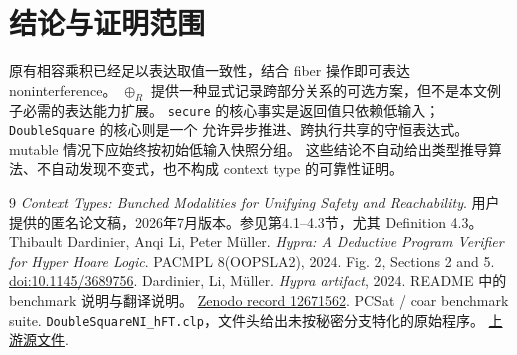 \documentclass[UTF8,a4paper,11pt,fontset=fandol]{ctexart}
\begin{document}
\section{结论与证明范围}
原有相容乘积已经足以表达取值一致性，结合 fiber 操作即可表达 noninterference。
$\oplus_R$ 提供一种显式记录跨部分关系的可选方案，但不是本文例子必需的表达能力扩展。
\texttt{secure} 的核心事实是返回值只依赖低输入；\texttt{DoubleSquare} 的核心则是一个
允许异步推进、跨执行共享的守恒表达式。mutable 情况下应始终按初始低输入快照分组。
这些结论不自动给出类型推导算法、不自动发现不变式，也不构成 context type 的可靠性证明。

\begin{thebibliography}{9}
\emph{Context Types: Bunched Modalities for Unifying Safety and Reachability}.
用户提供的匿名论文稿，2026年7月版本。参见第4.1--4.3节，尤其 Definition 4.3。
Thibault Dardinier, Anqi Li, Peter M\"uller.
\emph{Hypra: A Deductive Program Verifier for Hyper Hoare Logic}.
PACMPL 8(OOPSLA2), 2024. Fig. 2, Sections 2 and 5.
\href{https://doi.org/10.1145/3689756}{doi:10.1145/3689756}.
Dardinier, Li, M\"uller.
\emph{Hypra artifact}, 2024. README 中的 benchmark 说明与翻译说明。
\href{https://zenodo.org/records/12671562}{Zenodo record 12671562}.
PCSat / coar benchmark suite.
\texttt{DoubleSquareNI\_hFT.clp}，文件头给出未按秘密分支特化的原始程序。
\href{https://github.com/hiroshi-unno/coar/blob/master/benchmarks/pfwnCSP/cav2021rel/DoubleSquareNI_hFT.clp}{上游源文件}.
\end{thebibliography}
\end{document}
